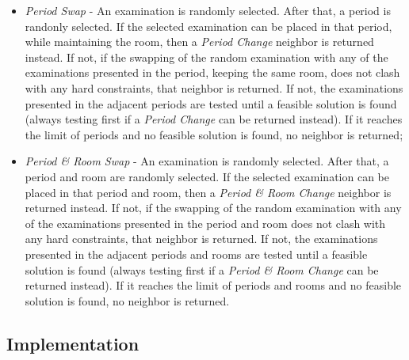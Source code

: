 \begin{itemize}
	\item \textit{Period Swap} -  An examination is randomly selected. After that, a period is randonly selected. If the selected examination can be placed in that period, while maintaining the room, then a \textit{Period Change} neighbor is returned instead. If not, if the swapping of the random examination with any of the examinations presented in the period, keeping the same room, does not clash with any hard constraints, that neighbor is returned. If not, the examinations presented in the adjacent periods are tested until a feasible solution is found (always testing first if a \textit{Period Change} can be returned instead). If it reaches the limit of periods and no feasible solution is found, no neighbor is returned;\\
	
	\item \textit{Period \& Room Swap} - An examination is randomly selected. After that, a period and room are randomly selected. If the selected examination can be placed in that period and room, then a \textit{Period \& Room Change} neighbor is returned instead. If not, if the swapping of the random examination with any of the examinations presented in the period and room does not clash with any hard constraints, that neighbor is returned. If not, the examinations presented in the adjacent periods and rooms are tested until a feasible solution is found (always testing first if a \textit{Period \& Room Change} can be returned instead). If it reaches the limit of periods and rooms and no feasible solution is found, no neighbor is returned.
\end{itemize}

\subsection{Implementation}

